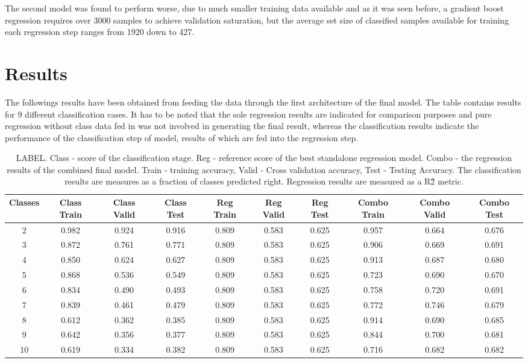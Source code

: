 The second model was found to perform worse, due to much smaller training data available and as it was seen before, a gradient boost regression requires over 3000 samples to achieve validation saturation, but the average set size of classified samples available for training each regression step  ranges from 1920 down to 427.


\section{Results}
The followings results have been obtained from feeding the data through the first architecture of the final model. The table contains results for 9 different classification cases. It has to be noted that the sole regression results are indicated for comparison purposes and pure regression without class data fed in was not involved in generating the final result, whereas the classification results indicate the performance of the classification step of model, results of which are fed into the regression step.


\begin{table}[!t]
\caption{LABEL. Class - score of the classification stage. Reg - reference score of the best standalone regression model. Combo - the regression results of the combined final model. Train - training accuracy, Valid - Cross validation accuracy, Test - Testing Accuracy. The classification results are measures as a fraction of classes predicted right. Regression results are measured as a R\^2 metric.}
\label{tab:top_ten_methods}
\centering
\begin{tabular}{|c|c|c|c|c|c|c|c|c|c|}
\hline
Classes & Class Train& Class Valid& Class Test& Reg Train& Reg Valid& Reg Test& Combo Train& Combo Valid& Combo Test \\
\hline
2 & 0.982 & 0.924 & 0.916 & 0.809 & 0.583 & 0.625 & 0.957 & 0.664 & 0.676 \\
3 & 0.872 & 0.761 & 0.771 & 0.809 & 0.583 & 0.625 & 0.906 & 0.669 & 0.691 \\ 
4 & 0.850 & 0.624 & 0.627 & 0.809 & 0.583 & 0.625 & 0.913 & 0.687 & 0.680 \\
5 & 0.868 & 0.536 & 0.549 & 0.809 & 0.583 & 0.625 & 0.723 & 0.690 & 0.670 \\
6 & 0.834 & 0.490 & 0.493 & 0.809 & 0.583 & 0.625 & 0.758 & 0.720 & 0.691 \\
7 & 0.839 & 0.461 & 0.479 & 0.809 & 0.583 & 0.625 & 0.772 & 0.746 & 0.679 \\
8 & 0.612 & 0.362 & 0.385 & 0.809 & 0.583 & 0.625 & 0.914 & 0.690 & 0.685 \\
9 & 0.642 & 0.356 & 0.377 & 0.809 & 0.583 & 0.625 & 0.844 & 0.700 & 0.681 \\
10 & 0.619 & 0.334 & 0.382 & 0.809 & 0.583 & 0.625 & 0.716 & 0.682 & 0.682 \\
\hline

\end{tabular}
\end{table}


